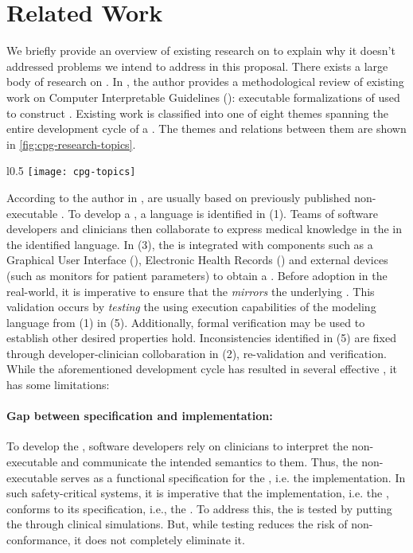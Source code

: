 \section{Related Work} \label{sec:related-work}

We briefly provide an overview of existing research on \CGSs{} to explain why
it doesn't addressed problems we intend to address in this proposal.
There exists a large body of research on \CGSs{}. In
\cite{PelegJBI13}, the author provides a methodological review of
existing work on Computer Interpretable Guidelines (\CIGs{}): executable
formalizations of \BPGs{} used to construct \CGSs{}.
Existing work is classified into one of eight themes spanning
the entire development cycle of a \CIG{}. The themes and relations between them
are shown in \figurename{} \ref{fig:cpg-research-topics}.

\begin{wrapfigure}{l}{0.5\textwidth}
  \texttt{[image: cpg-topics]}
  \caption{\CGSs{} Research Themes}\label{fig:cpg-research-topics}
\end{wrapfigure}

According to the author in \cite{PelegJBI13}, \CIGs{} are usually based on previously published non-executable
\BPGs{}. To develop a \CIG{}, a language is identified in (1). Teams of
software developers and clinicians then collaborate to express medical knowledge
in the \BPG{} in the identified language. In (3), the \CIG{}
is integrated with components such as a Graphical User
Interface (\GUI{}), Electronic Health Records (\EHRs{}) and external devices
(such as monitors for patient parameters) to obtain a \CGS. Before adoption
in the real-world, it is imperative to ensure that the \CIG{} \emph{mirrors}
the underlying \BPG{}. This validation occurs by \emph{testing} the \CGS{}
using execution capabilities of the modeling language from (1) in (5).
Additionally, formal verification may be used to establish other desired
properties hold. Inconsistencies identified in (5) are fixed through developer-clinician
collobaration in (2),  re-validation and
verification. While the aforementioned development cycle has resulted in several
effective \CGSs{}, it has some limitations:

\paragraph{Gap between specification and implementation:}

To develop the \CIG{}, software developers rely on clinicians to interpret the
non-executable \BPG{} and communicate
the intended semantics to them. Thus, the non-executable \BPG{} serves as a functional specification for
the \CIG{}, i.e. the implementation. In such safety-critical systems, it is
imperative that the implementation, i.e. the \CIG{}, conforms to its
specification, i.e., the \BPG{}. To address this, the \CIG{} is tested by
putting the \CGS{} through clinical simulations. But, while testing reduces
the risk of non-conformance, it does not completely eliminate it.

